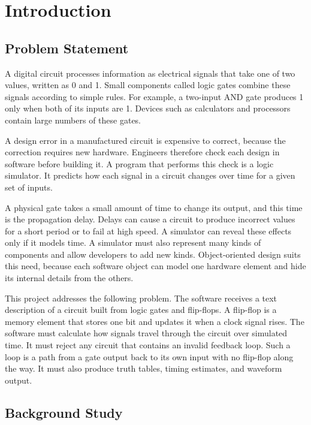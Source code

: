 \section{Introduction}
\label{sec:introduction}

\subsection{Problem Statement}

A digital circuit processes information as electrical signals that take one of two values, written as 0 and 1.
Small components called logic gates combine these signals according to simple rules.
For example, a two-input AND gate produces 1 only when both of its inputs are 1.
Devices such as calculators and processors contain large numbers of these gates.

A design error in a manufactured circuit is expensive to correct, because the correction requires new hardware.
Engineers therefore check each design in software before building it.
A program that performs this check is a logic simulator.
It predicts how each signal in a circuit changes over time for a given set of inputs.

A physical gate takes a small amount of time to change its output, and this time is the propagation delay.
Delays can cause a circuit to produce incorrect values for a short period or to fail at high speed.
A simulator can reveal these effects only if it models time.
A simulator must also represent many kinds of components and allow developers to add new kinds.
Object-oriented design suits this need, because each software object can model one hardware element and hide its internal details from the others.

This project addresses the following problem.
The software receives a text description of a circuit built from logic gates and flip-flops.
A flip-flop is a memory element that stores one bit and updates it when a clock signal rises.
The software must calculate how signals travel through the circuit over simulated time.
It must reject any circuit that contains an invalid feedback loop.
Such a loop is a path from a gate output back to its own input with no flip-flop along the way.
It must also produce truth tables, timing estimates, and waveform output.

\subsection{Background Study}

